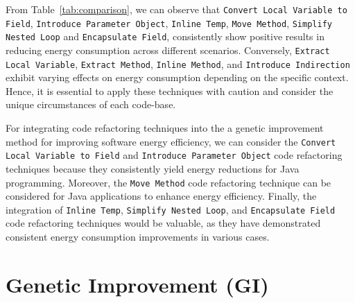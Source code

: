 From Table~\ref{tab:comparison}, we can observe that \texttt{Convert Local Variable to Field}, \texttt{Introduce Parameter Object}, \texttt{Inline Temp}, \texttt{Move Method}, \texttt{Simplify Nested Loop} and \texttt{Encapsulate Field}, consistently show positive results in reducing energy consumption across different scenarios. 
%
%
Conversely, \texttt{Extract Local Variable}, \texttt{Extract Method}, \texttt{Inline Method}, and \texttt{Introduce Indirection} exhibit varying effects on energy consumption depending on the specific context. Hence, it is essential to apply these techniques with caution and consider the unique circumstances of each code-base.

\vspace{.5em}
For integrating code refactoring techniques into the
a genetic improvement method %
for improving software energy efficiency, we can consider 
the \texttt{Convert Local Variable to Field} and \texttt{Introduce Parameter Object} code refactoring techniques because they consistently yield energy reductions for Java programming. Moreover, the \texttt{Move Method} code refactoring technique
can be considered for Java applications to enhance energy efficiency. Finally, the integration of \texttt{Inline Temp}, \texttt{Simplify Nested Loop}, and \texttt{Encapsulate Field} code refactoring techniques would be valuable, as they have demonstrated consistent energy consumption improvements in various cases. 


\section{Genetic Improvement (GI)}


